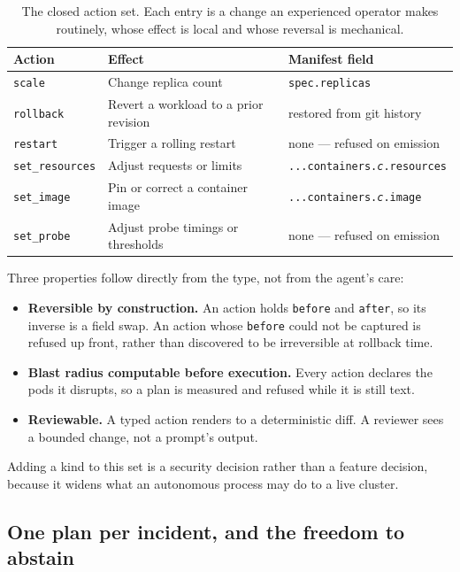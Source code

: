\documentclass[11pt,a4paper]{article}
\newcommand{\code}[1]{\texttt{\small #1}}
\begin{document}
\begin{table}[h]
\centering
\small
\begin{tabularx}{\textwidth}{@{}l X l@{}}
\toprule
\textbf{Action} & \textbf{Effect} & \textbf{Manifest field} \\
\midrule
\code{scale}          & Change replica count                    & \code{spec.replicas} \\
\code{rollback}       & Revert a workload to a prior revision   & restored from git history \\
\code{restart}        & Trigger a rolling restart               & none --- refused on emission \\
\code{set\_resources} & Adjust requests or limits               & \code{...containers.\emph{c}.resources} \\
\code{set\_image}     & Pin or correct a container image        & \code{...containers.\emph{c}.image} \\
\code{set\_probe}     & Adjust probe timings or thresholds      & none --- refused on emission \\
\bottomrule
\end{tabularx}
\caption{The closed action set. Each entry is a change an experienced operator
makes routinely, whose effect is local and whose reversal is mechanical.}
\end{table}

Three properties follow directly from the type, not from the agent's care:

\begin{itemize}
  \item \textbf{Reversible by construction.} An action holds \code{before} and \code{after}, so its inverse is a field swap. An action whose \code{before} could not be captured is refused up front, rather than discovered to be irreversible at rollback time.
  \item \textbf{Blast radius computable before execution.} Every action declares the pods it disrupts, so a plan is measured and refused while it is still text.
  \item \textbf{Reviewable.} A typed action renders to a deterministic diff. A reviewer sees a bounded change, not a prompt's output.
\end{itemize}

Adding a kind to this set is a security decision rather than a feature decision,
because it widens what an autonomous process may do to a live cluster.

\subsection{One plan per incident, and the freedom to abstain}
\end{document}
